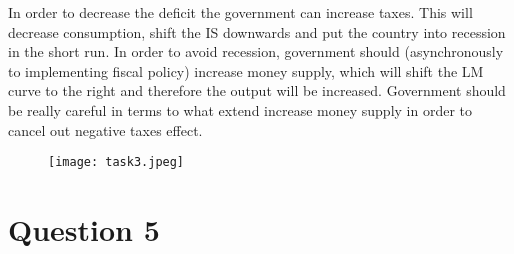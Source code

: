 \documentclass[11pt, oneside]{article}
\begin{document}
In order to decrease the deficit the government can increase taxes. This will decrease consumption, shift the IS downwards and put the country into recession in the short run. In order to avoid recession, government should (asynchronously to implementing fiscal policy) increase money supply, which will shift the LM curve to the right and therefore the output will be increased. Government should be really careful in terms to what extend increase money supply in order to cancel out negative taxes effect.

\begin{figure}[!hbtp]
	\centering
	\texttt{[image: task3.jpeg]}
\end{figure}

\section*{Question 5}
\end{document}

